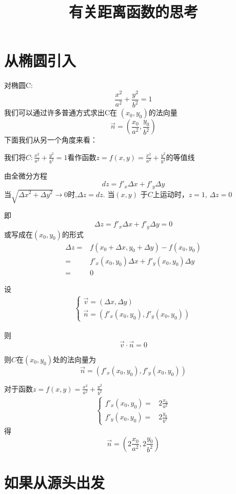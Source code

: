 \documentclass[12pt,a4paper]{article}
\title{有关距离函数的思考}
\renewcommand{\(}{\left(}
\renewcommand{\)}{\right)}
\newcommand{\D}{\Delta}
\begin{document}
\maketitle

\section{从椭圆引入}

对椭圆C:
$$ \frac{x^2}{a^2}+\frac{y^2}{b^2}=1$$
我们可以通过许多普通方式求出C在 $\(x_0,y_0\)$的法向量
$$ \vec{n}=\( \frac{x_0}{a^2},\frac{y_0}{b^2} \)$$
下面我们从另一个角度来看：
    
我们将$C: \frac{x^2}{a^2}+\frac{y^2}{b^2}=1 $看作函数$z=f\(x,y\)=\frac{x^2}{a^2}+\frac{y^2}{b^2}$的等值线
    
由全微分方程$$dz=f'_x \Delta x+f'_y \Delta y$$
当$\sqrt{{\D x}^2+{\D y}^2} \to 0$时,$\D z=dz$.{ }
当$\( x,y \)$ 于$C$上运动时，$z=1$,
$\D z=0$
    
即$$\D z=f'_x \Delta x+f'_y \Delta y=0$$
或写成在$ \(x_0,y_0 \)$的形式
\begin{align*}
\D z  =&   f \(x_0+\D x,y_0+\D y \) -f \(x_0,y_0 \)    \\
        =&  f'_x \(x_0,y_0 \)\Delta x+f'_y\(x_0,y_0 \) \Delta y\\
        =&0
\end{align*}

设
\begin{align*}
\begin{cases}
\vec{v}     =   \(\D x,\D y\) \\
\vec{n}     =   \( f'_x \(x_0,y_0 \),f'_y\(x_0,y_0 \) \)
\end{cases}
\end{align*}

则$$\vec{v}  \cdot  \vec{n} =0$$

则$C$在$  \( x_0 , y_0 \)  $处的法向量为
$$   \vec{n}     =   \( f'_x \(x_0,y_0 \),f'_y\(x_0,y_0 \) \)$$

对于函数$z=f\(x,y\)=\frac{x^2}{a^2}+\frac{y^2}{b^2}$
\begin{align*}
\begin{cases}
 f'_x \(x_0,y_0 \)=&   2 \frac{x_0}{a^2}  \\
f'_y\(x_0,y_0 \)=&    2\frac{y_0}{b^2} 
\end{cases}
\end{align*}
得$$ \vec{n}=\(2  \frac{x_0}{a^2},2  \frac{y_0}{b^2} \)$$

\section{如果从源头出发}
\end{document}
